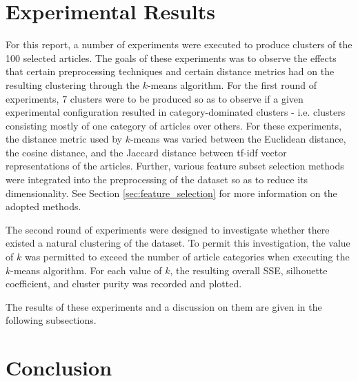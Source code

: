 \documentclass[11pt]{article}
\begin{document}
\section{Experimental Results}

For this report, a number of experiments were executed to produce clusters of the 100 selected articles.
The goals of these experiments was to observe the effects that certain preprocessing techniques and certain distance metrics had on the resulting clustering through the $k$-means algorithm.
For the first round of experiments, 7 clusters were to be produced so as to observe if a given experimental configuration resulted in category-dominated clusters - i.e. clusters consisting mostly of one category of articles over others.
For these experiments, the distance metric used by $k$-means was varied between the Euclidean distance, the cosine distance, and the Jaccard distance between tf-idf vector representations of the articles.
Further, various feature subset selection methods were integrated into the preprocessing of the dataset so as to reduce its dimensionality.
See Section \ref{sec:feature_selection} for more information on the adopted methods.

The second round of experiments were designed to investigate whether there existed a natural clustering of the dataset.
To permit this investigation, the value of $k$ was permitted to exceed the number of article categories when executing the $k$-means algorithm.
For each value of $k$, the resulting overall SSE, silhouette coefficient, and cluster purity was recorded and plotted.

The results of these experiments and a discussion on them are given in the following subsections.








\section{Conclusion}


{}

\end{document}
